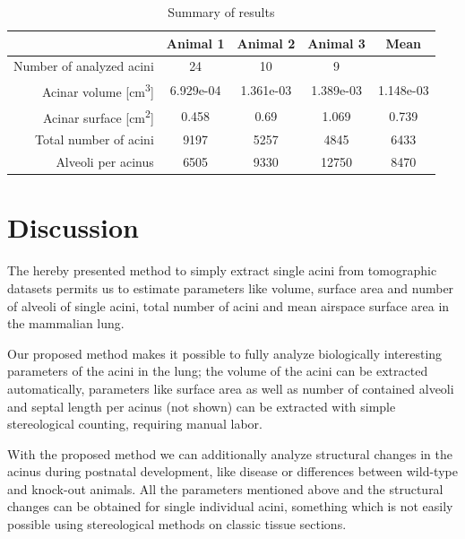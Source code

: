 \documentclass[draft,a4paper,DIVcalc,abstract,english]{scrartcl}
\newcommand{\numberofaciniB}{24}
\newcommand{\numberofaciniD}{10}
\newcommand{\numberofaciniE}{9}
\newcommand{\totalnumberofaciniB}{9197}
\newcommand{\totalnumberofaciniD}{5257}
\newcommand{\totalnumberofaciniE}{4845}
\newcommand{\meantotalnumberofacini}{6433}
\newcommand{\acinarvolumeB}{6.929e-04} %
\newcommand{\acinarvolumeD}{1.361e-03} %
\newcommand{\acinarvolumeE}{1.389e-03} %
\newcommand{\meanacinarvolume}{1.148e-03} %
\newcommand{\numberofalveoliB}{6505}
\newcommand{\numberofalveoliD}{9330}
\newcommand{\numberofalveoliE}{12750}
\newcommand{\meannumberofalveoli}{8470} %
\newcommand{\acinarsurfaceB}{0.458} %
\newcommand{\acinarsurfaceD}{0.69} %
\newcommand{\acinarsurfaceE}{1.069} %
\newcommand{\meanacinarsurface}{0.739} %
\begin{document}
\begin{table}
	\centering
	\caption{Summary of results}
	\begin{tabular}{rcccc}
	\toprule
															& Animal 1 & Animal 2 & Animal 3 & Mean\\
	\midrule
	Number of analyzed acini 							& \numberofaciniB & \numberofaciniD & \numberofaciniE & \\
	Acinar volume [\si{\cubic\centi\meter}]		& \acinarvolumeB & \acinarvolumeD & \acinarvolumeE & \meanacinarvolume \\
	Acinar surface [\si{\centi\meter\squared}]	& \acinarsurfaceB & \acinarsurfaceD & \acinarsurfaceE & \meanacinarsurface \\
	Total number of acini 								& \totalnumberofaciniB & \totalnumberofaciniD & \totalnumberofaciniE & \meantotalnumberofacini \\
	Alveoli per acinus 									& \numberofalveoliB & \numberofalveoliD & \numberofalveoliE & \meannumberofalveoli \\
	\bottomrule
	\end{tabular}
	\label{tab:results}
\end{table}

\section{Discussion}
The hereby presented method to simply extract single acini from tomographic datasets permits us to estimate parameters like volume, surface area and number of alveoli of single acini, total number of acini and mean airspace surface area in the mammalian lung.

Our proposed method makes it possible to fully analyze biologically interesting parameters of the acini in the lung; the volume of the acini can be extracted automatically, parameters like surface area as well as number of contained alveoli and septal length per acinus (not shown) can be extracted with simple stereological counting, requiring manual labor.

With the proposed method we can additionally analyze structural changes in the acinus during postnatal development, like disease or differences between wild-type and knock-out animals.
All the parameters mentioned above and the structural changes can be obtained for single individual acini, something which is not easily possible using stereological methods on classic tissue sections.
\end{document}
